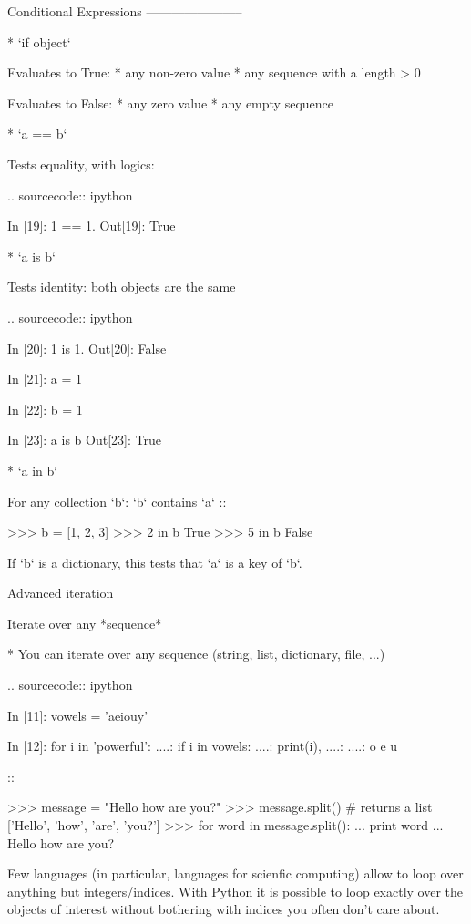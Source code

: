 \documentclass[a4paper,11pt]{extarticle}
\begin{document}
Conditional Expressions
-----------------------

* `if object`

  Evaluates to True:
    * any non-zero value
    * any sequence with a length > 0

  Evaluates to False:
    * any zero value
    * any empty sequence

* `a == b`

  Tests equality, with logics:

  .. sourcecode:: ipython

    In [19]: 1 == 1.
    Out[19]: True

* `a is b`

  Tests identity: both objects are the same

  .. sourcecode:: ipython

    In [20]: 1 is 1.
    Out[20]: False

    In [21]: a = 1

    In [22]: b = 1

    In [23]: a is b
    Out[23]: True

* `a in b`

  For any collection `b`: `b` contains `a` ::

    >>> b = [1, 2, 3]
    >>> 2 in b
    True
    >>> 5 in b
    False


  If `b` is a dictionary, this tests that `a` is a key of `b`.

Advanced iteration


Iterate over any *sequence*


* You can iterate over any sequence (string, list, dictionary, file, ...)

  .. sourcecode:: ipython

    In [11]: vowels = 'aeiouy'

    In [12]: for i in 'powerful':
       ....:     if i in vowels:
       ....:         print(i),
       ....:         
       ....:         
    o e u

::

    >>> message = "Hello how are you?"
    >>> message.split() # returns a list
    ['Hello', 'how', 'are', 'you?']
    >>> for word in message.split():
    ...     print word
    ...     
    Hello
    how
    are
    you?

Few languages (in particular, languages for scienfic computing) allow to
loop over anything but integers/indices. With Python it is possible to
loop exactly over the objects of interest without bothering with indices
you often don't care about.
 
\end{document}
